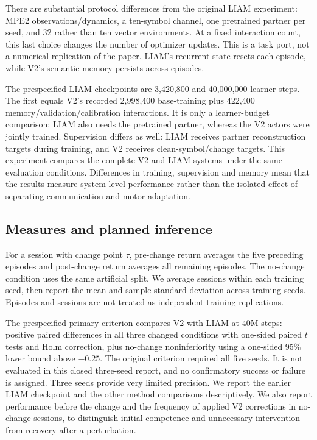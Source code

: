 \documentclass[10pt,a4paper]{article}
\begin{document}
There are substantial protocol differences from the original LIAM experiment: MPE2 observations/dynamics, a ten-symbol channel, one pretrained partner per seed, and 32 rather than ten vector environments. At a fixed interaction count, this last choice changes the number of optimizer updates. This is a task port, not a numerical replication of the paper. LIAM's recurrent state resets each episode, while V2's semantic memory persists across episodes.

The prespecified LIAM checkpoints are 3,420,800 and 40,000,000 learner steps. The first equals V2's recorded 2,998,400 base-training plus 422,400 memory/validation/calibration interactions. It is only a learner-budget comparison: LIAM also needs the pretrained partner, whereas the V2 actors were jointly trained. Supervision differs as well: LIAM receives partner reconstruction targets during training, and V2 receives clean-symbol/change targets. This experiment compares the complete V2 and LIAM systems under the same evaluation conditions. Differences in training, supervision and memory mean that the results measure system-level performance rather than the isolated effect of separating communication and motor adaptation.

\subsection{Measures and planned inference}
For a session with change point $\tau$, pre-change return averages the five preceding episodes and post-change return averages all remaining episodes. The no-change condition uses the same artificial split. We average sessions within each training seed, then report the mean and sample standard deviation across training seeds. Episodes and sessions are not treated as independent training replications.

The prespecified primary criterion compares V2 with LIAM at 40M steps: positive paired differences in all three changed conditions with one-sided paired $t$ tests and Holm correction, plus no-change noninferiority using a one-sided 95\% lower bound above $-0.25$. The original criterion required all five seeds. It is not evaluated in this closed three-seed report, and no confirmatory success or failure is assigned. Three seeds provide very limited precision. We report the earlier LIAM checkpoint and the other method comparisons descriptively. We also report performance before the change and the frequency of applied V2 corrections in no-change sessions, to distinguish initial competence and unnecessary intervention from recovery after a perturbation.
\end{document}
